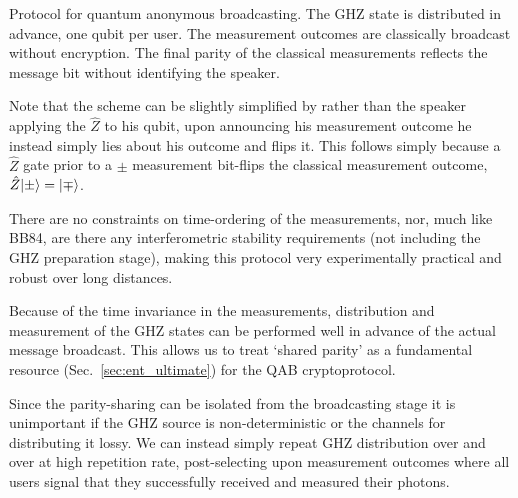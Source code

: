 \begin{table}[!htbp]
\captionspacealg \caption{Protocol for quantum anonymous broadcasting. The GHZ state is distributed in advance, one qubit per user. The measurement outcomes are classically broadcast without encryption. The final parity of the classical measurements reflects the message bit without identifying the speaker.} \label{alg:QAB}
\end{table}

Note that the scheme can be slightly simplified by rather than the speaker applying the $\hat{Z}$ to his qubit, upon announcing his measurement outcome he instead simply lies about his outcome and flips it. This follows simply because a $\hat{Z}$ gate prior to a $\pm$ measurement bit-flips the classical measurement outcome, \mbox{$\hat{Z}|\pm\rangle=|\mp\rangle$}.

There are no constraints on time-ordering of the measurements, nor, much like BB84, are there any interferometric stability requirements (not including the GHZ preparation stage), making this protocol very experimentally practical and robust over long distances.

Because of the time invariance in the measurements, distribution and measurement of the GHZ states can be performed well in advance of the actual message broadcast. This allows us to treat `shared parity' as a fundamental resource (Sec.~\ref{sec:ent_ultimate}) for the QAB cryptoprotocol.

Since the parity-sharing can be isolated from the broadcasting stage it is unimportant if the GHZ source is non-deterministic or the channels for distributing it lossy. We can instead simply repeat GHZ distribution over and over at high repetition rate, post-selecting upon measurement outcomes where all users signal that they successfully received and measured their photons.

